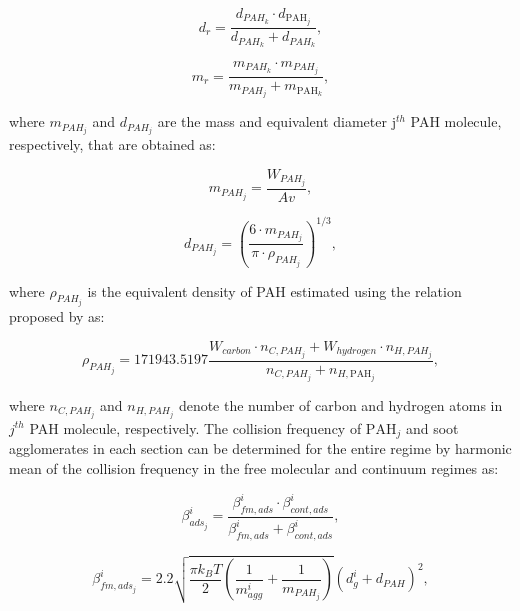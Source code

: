 \begin{equation}
	d_{r}=
	\frac{d_{{PAH}_k}\cdot d_{\mathrm{PAH}_j}}{d_{{PAH}_k}+d_{{PAH}_k}},
	\label{eqn:drPAH}
\end{equation}

\begin{equation}
	m_{r}=
		\frac{m_{{PAH}_k}\cdot m_{{PAH}_j}}{m_{{PAH}_j}+ m_{\mathrm{PAH}_k}},
	\label{eqn:mrPAH}
\end{equation}

\noindent where $m_{PAH_j}$ and $d_{PAH_j}$ are the mass and equivalent diameter $\mathrm{j}^{th}$ PAH molecule, respectively, that are obtained as:

\begin{equation}
	m_{PAH_j}=
	\frac{W_{{PAH}_j}}{Av},
	\label{eqn:mPAH}
\end{equation}

\begin{equation}
	d_{PAH_j}=
	\left(
		\frac{6\cdot m_{{PAH}_j}}{\pi\cdot\rho_{{PAH}_j}}
	\right)^{1/3},
	\label{eqn:dPAH}
\end{equation}

\noindent where $\rho_{PAH_j}$ is the equivalent density of PAH estimated using the relation proposed by \citet{johansson2016formation} as:

\begin{equation}
	\rho_{PAH_j}= 
	171943.5197
	\frac{W_{carbon}\cdot n_{C,{PAH}_j}+W_{hydrogen}\cdot n_{H,{PAH}_j}}
	{n_{C,{PAH}_j}+n_{H,\mathrm{PAH}_j}},
	\label{eqn:rhoPAH}
\end{equation}

\noindent where ${n_{C,{PAH}_j}}$ and ${n_{H,{PAH}_j}}$ denote the number of carbon and hydrogen atoms in $j^{th}$ PAH molecule, respectively. The collision frequency of $\mathrm{PAH}_j$ and soot agglomerates in each section can be determined for the entire regime by harmonic mean of the collision frequency in the free molecular and continuum regimes as:

\begin{equation}
	\beta^i_{ads_j}=
	\frac{\beta^i_{fm, ads}\cdot \beta^i_{cont, ads}}
	{\beta^i_{fm, ads}+\beta^i_{cont, ads}},
	\label{eqn:betahmads}
\end{equation}

\begin{equation}
	\beta^i_{fm, ads_j}=
	2.2 
	\sqrt{
		\frac{\pi k_B T}{2}\left(\frac{1}{m^i_{agg}}+\frac{1}{m_{PAH_j}}\right)
	}
	\left(d^i_g+d_{PAH}\right)^2,
	\label{eqn:betafmads}
\end{equation}

